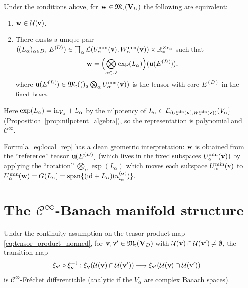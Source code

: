 \begin{lemma}
\label{lem:element}
Under the conditions above, for $\mathbf{w} \in \mathfrak{M}_{\mathfrak{r}}(\mathbf{V}_D)$
the following are equivalent:
\begin{enumerate}
\item[\textup{(a)}] $\mathbf{w} \in \mathcal{U}(\mathbf{v})$.
\item[\textup{(b)}] There exists a unique pair
    $((L_\alpha)_{\alpha \in D},\, E^{(D)}) \in
    \prod_\alpha \mathcal{L}(U^{\min}_{\alpha}(\mathbf{v}), W^{\min}_{\alpha}(\mathbf{v}))
    \times \mathbb{R}^{\times r_\alpha}_*$
    such that
    \begin{equation}
    \label{eq:local_rep}
        \mathbf{w} = \Bigl(\bigotimes_{\alpha \in D} \exp(L_\alpha)\Bigr)
              (\mathbf{u}(E^{(D)})),
    \end{equation}
    where $\mathbf{u}(E^{(D)}) \in \mathfrak{M}_{\mathfrak{r}}((){}_a\bigotimes_\alpha
    U^{\min}_{\alpha}(\mathbf{v}))$ is the tensor with core $E^{(D)}$ in the
    fixed bases.
\end{enumerate}
\end{lemma}

Here $\exp(L_\alpha) = \mathrm{id}_{V_\alpha} + L_\alpha$ by the nilpotency
of $L_\alpha \in \mathcal{L}_{(U^{\min}_{\alpha}(\mathbf{v}),W^{\min}_{\alpha}(\mathbf{v}))}(V_\alpha)$
(Proposition~\ref{prop:nilpotent_algebra}), so the representation is
polynomial and $\mathcal{C}^\infty$.

\begin{remark}
\label{rem:chart_geometric}
Formula~\eqref{eq:local_rep} has a clean geometric interpretation:
$\mathbf{w}$ is obtained from the ``reference'' tensor $\mathbf{u}(E^{(D)})$
(which lives in the fixed subspaces $U^{\min}_{\alpha}(\mathbf{v})$) by applying
the ``rotation'' $\bigotimes_\alpha \exp(L_\alpha)$ which moves each
subspace $U^{\min}_{\alpha}(\mathbf{v})$ to $U^{\min}_{\alpha}(\mathbf{w}) = G(L_\alpha)
= \mathrm{span}\{(\mathrm{id}_{} + L_\alpha)(u^{(\alpha)}_{i_\alpha})\}$.
\end{remark}

\section{The $\mathcal{C}^\infty$-Banach manifold structure}
\label{sec:tucker_manifold:cinfty}

\begin{lemma}
\label{lem:premanifold}
Under the continuity assumption on the tensor product map
\eqref{eq:tensor_product_normed}, for $\mathbf{v}, \mathbf{v}' \in
\mathfrak{M}_{\mathfrak{r}}(\mathbf{V}_D)$ with $\mathcal{U}(\mathbf{v}) \cap \mathcal{U}(\mathbf{v}') \neq \emptyset$,
the transition map
\begin{equation*}
    \xi_{\mathbf{v}'} \circ \xi_{\mathbf{v}}^{-1} :
    \xi_{\mathbf{v}}(\mathcal{U}(\mathbf{v}) \cap \mathcal{U}(\mathbf{v}'))
    \longrightarrow
    \xi_{\mathbf{v}'}(\mathcal{U}(\mathbf{v}) \cap \mathcal{U}(\mathbf{v}'))
\end{equation*}
is $\mathcal{C}^\infty$-Fréchet differentiable \textup{(}analytic if
the $V_\alpha$ are complex Banach spaces\textup{)}.
\end{lemma}

